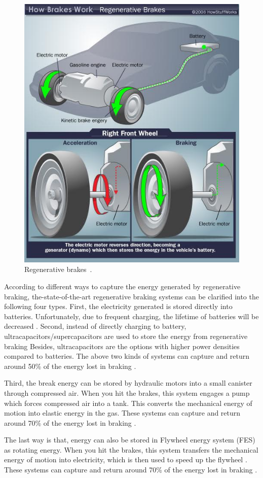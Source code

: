 \begin{figure}
\centering
\includegraphics[width=1.0\hsize]{Figures/Jason_Xue/JX_brake.jpg}
\caption{Regenerative brakes~\cite{JX_regen_fig}.}
\label{fig:JX_break}
\end{figure}      

According to different ways to capture the energy generated by regenerative braking, the-state-of-the-art regenerative braking systems can be clarified into the following four types.
First, the electricity generated is stored directly into batteries.
Unfortunately, due to frequent charging, the lifetime of batteries will be decreased \cite{JX_4450599,JX_4677669}.
Second, instead of directly charging to battery, ultracapacitors/supercapacitors are used to store the energy from regenerative braking \cite{JX_5764539,JX_5446335}
Besides, ultracapacitors are the options with higher power densities compared to batteries.
The above two kinds of systems can capture and return around 50\% of the energy lost in braking \cite{JX_DATE,JX_Tie2013}.

Third, the break energy can be stored by hydraulic motors into a small canister through compressed air. When you hit the brakes, this system engages a pump which forces compressed air into a tank.
This converts the mechanical energy of motion into elastic energy in the gas.
These systems can capture and return around 70\% of the energy lost in braking \cite{JX_2002013128,JX_2008valents}.

The last way is that, energy can also be stored in Flywheel energy system (FES) as rotating energy.
When you hit the brakes, this system transfers the mechanical energy of motion into electricity, which is then used to speed up the flywheel \cite{JX_5472647,JX_5686984,JX_993788}.
These systems can capture and return around 70\% of the energy lost in braking \cite{JX_DATE}.


